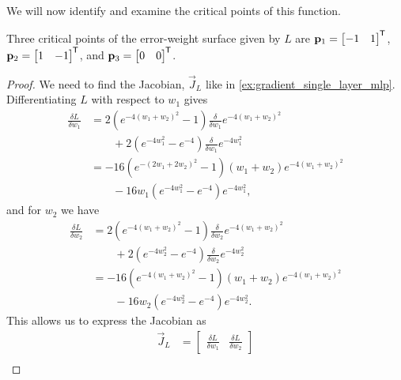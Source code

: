 We will now identify and examine the critical points of this function.
\begin{lemma}
    \label{lmm:stripe_critical_points}
    Three critical points of the error-weight surface given by $L$ are 
    $\mathbf{p}_1 = \begin{bmatrix}
        -1 & 1
    \end{bmatrix}^{\mkern-1.5mu\mathsf{T}}$,
    $\mathbf{p}_2 = \begin{bmatrix}
        1 & -1
    \end{bmatrix}^{\mkern-1.5mu\mathsf{T}}$, and
    $\mathbf{p}_3 = \begin{bmatrix}
        0 & 0
    \end{bmatrix}^{\mkern-1.5mu\mathsf{T}}$.
\end{lemma}

\begin{proof}
    We need to find the Jacobian, $\vec{J}_L$ like in \ref{ex:gradient_single_layer_mlp}. 
    Differentiating $L$ with respect to $w_1$ gives
    \begin{align*}
        \frac{\delta L}{\delta w_1}
        &= 2 \left(e^{-4(w_1 + w_2)^2} - 1\right) \frac{\delta}{\delta w_1} e^{-4(w_1 + w_2)^2} \\
        &\qquad + 2 \left(e^{-4w_1^2} - e^{-4}\right) \frac{\delta}{\delta w_1} e^{-4w_1^2} \\
        &= -16 \left(e^{-(2 w_1 + 2 w_2)^2} - 1\right) \left(w_1 + w_2 \right) e^{-4(w_1 + w_2)^2} \\
        &\qquad -16 w_1 \left(e^{-4 w_1^2} - e^{-4}\right) e^{-4 w_1^2},
    \end{align*}
    and for $w_2$ we have
    \begin{align*}
        \frac{\delta L}{\delta w_2}
        &= 2 \left(e^{-4(w_1 + w_2)^2} - 1\right) \frac{\delta}{\delta w_2} e^{-4(w_1 + w_2)^2} \\
        &\qquad + 2 \left(e^{-4w_2^2} - e^{-4}\right) \frac{\delta}{\delta w_2} e^{-4w_2^2} \\
        &= -16 \left(e^{-4(w_1 + w_2)^2} - 1\right) \left(w_1 + w_2 \right) e^{-4(w_1 + w_2)^2} \\
        &\qquad -16 w_2 \left(e^{-4 w_2^2} - e^{-4}\right) e^{-4 w_2^2}.
    \end{align*}
    This allows us to express the Jacobian as
    \begin{align*}
        \vec{J}_L
        &= \begin{bmatrix}
            \frac{\delta L}{\delta w_1} &
            \frac{\delta L}{\delta w_2}
        \end{bmatrix} \\

\end{align*}
\end{proof}
